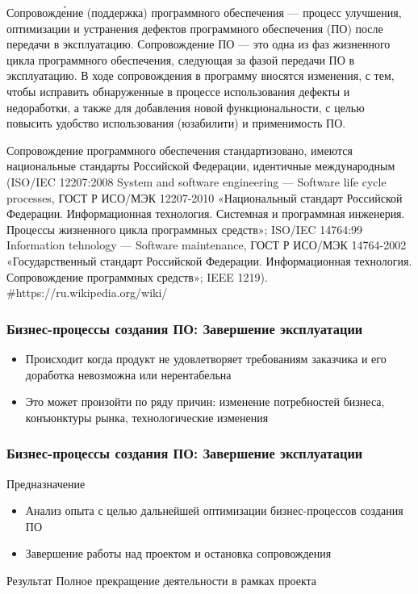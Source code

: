 \documentclass{../industrial-development}
\begin{document}
Сопровожде́ние (поддержка) программного обеспечения — процесс улучшения, оптимизации и устранения дефектов программного обеспечения (ПО) после передачи в эксплуатацию. Сопровождение ПО — это одна из фаз жизненного цикла программного обеспечения, следующая за фазой передачи ПО в эксплуатацию. В ходе сопровождения в программу вносятся изменения, с тем, чтобы исправить обнаруженные в процессе использования дефекты и недоработки, а также для добавления новой функциональности, с целью повысить удобство использования (юзабилити) и применимость ПО.

Сопровождение программного обеспечения стандартизовано, имеются национальные стандарты Российской Федерации, идентичные международным (ISO/IEC 12207:2008 System and software engineering — Software life cycle processes, ГОСТ Р ИСО/МЭК 12207-2010 «Национальный стандарт Российской Федерации. Информационная технология. Системная и программная инженерия. Процессы жизненного цикла программных средств»; ISO/IEC 14764:99 Information tehnology — Software maintenance, ГОСТ Р ИСО/МЭК 14764-2002 «Государственный стандарт Российской Федерации. Информационная технология. Сопровождение программных средств»; IEEE 1219). 
#https://ru.wikipedia.org/wiki/%


\begin{frame} \frametitle{Бизнес-процессы создания ПО: Завершение эксплуатации}
	\begin{itemize}
		\item Происходит когда продукт не удовлетворяет требованиям заказчика и его доработка невозможна или нерентабельна
		\item Это может произойти по ряду причин: изменение потребностей бизнеса, конъюнктуры рынка, технологические изменения
	\end{itemize}
\end{frame}
\lecturenotes


\begin{frame} \frametitle{Бизнес-процессы создания ПО: Завершение эксплуатации}
	\begin{block}{Предназначение}
		\begin{itemize}
			\item Анализ опыта с целью дальнейшей оптимизации бизнес-процессов создания ПО
			\item Завершение работы над проектом и остановка сопровождения
		\end{itemize}
	\end{block}
	\begin{block}{Результат}
		Полное прекращение деятельности в рамках проекта
	\end{block}
\end{frame}
\lecturenotes
\end{document}
